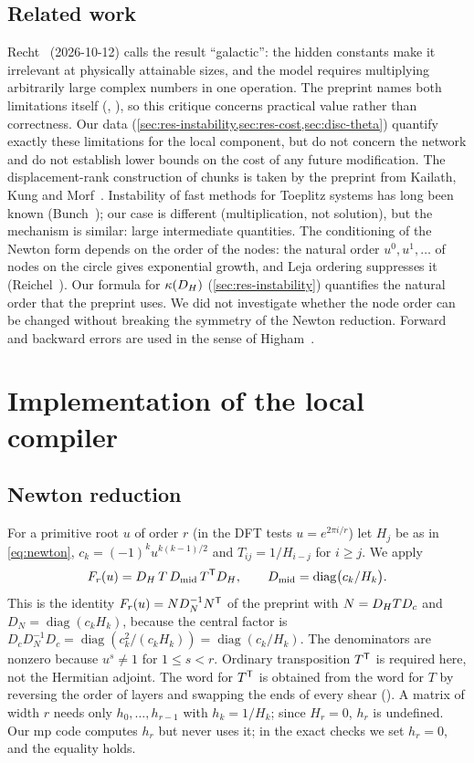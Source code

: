 \documentclass[11pt]{article}
\theoremstyle{plain}
\DeclareMathOperator{\diag}{diag}
\begin{document}
\subsection{Related work}\label{sec:related}
Recht~\citep{recht2026} (2026-10-12) calls the result ``galactic'': the hidden constants make it irrelevant at physically attainable sizes, and the model requires multiplying arbitrarily large complex numbers in one operation. The preprint names both limitations itself (, ), so this critique concerns practical value rather than correctness. Our data (\cref{sec:res-instability,sec:res-cost,sec:disc-theta}) quantify exactly these limitations for the local component, but do not concern the network and do not establish lower bounds on the cost of any future modification. The displacement-rank construction of chunks is taken by the preprint from Kailath, Kung and Morf~\citep{kailath1979}. Instability of fast methods for Toeplitz systems has long been known (Bunch~\citep{bunch1985}); our case is different (multiplication, not solution), but the mechanism is similar: large intermediate quantities. The conditioning of the Newton form depends on the order of the nodes: the natural order $u^0,u^1,\dots$ of nodes on the circle gives exponential growth, and Leja ordering suppresses it (Reichel~\citep{reichel1990}). Our formula for $\kappa(D_H)$ (\cref{sec:res-instability}) quantifies the natural order that the preprint uses. We did not investigate whether the node order can be changed without breaking the symmetry of the Newton reduction. Forward and backward errors are used in the sense of Higham~\citep{higham2002}.

\section{Implementation of the local compiler}\label{sec:impl}

\subsection{Newton reduction}\label{sec:newton}
For a primitive root $u$ of order $r$ (in the DFT tests $u=e^{2\pi i/r}$) let $H_j$ be as in \eqref{eq:newton}, $c_k=(-1)^ku^{k(k-1)/2}$ and $T_{ij}=1/H_{i-j}$ for $i\ge j$. We apply
\begin{equation}\label{eq:chain}
F_r(u)=\Dh\,T\,\Dmid\,T^{\T}\Dh,\qquad \Dmid=\diag\bigl(c_k/H_k\bigr).
\end{equation}
This is the identity $F_r(u)=ND_N^{-1}N^{\mathsf{T}}$ of the preprint with $N=D_H TD_c$ and $D_N=\diag(c_kH_k)$, because the central factor is $D_cD_N^{-1}D_c=\diag(c_k^2/(c_kH_k))=\diag(c_k/H_k)$. The denominators are nonzero because $u^s\ne1$ for $1\le s<r$. Ordinary transposition $T^{\mathsf{T}}$ is required here, not the Hermitian adjoint. The word for $T^{\mathsf{T}}$ is obtained from the word for $T$ by reversing the order of layers and swapping the ends of every shear (). A matrix of width $r$ needs only $h_0,\dots,h_{r-1}$ with $h_k=1/H_k$; since $H_r=0$, $h_r$ is undefined. Our mp code computes $h_r$ but never uses it; in the exact checks we set $h_r=0$, and the equality holds.
\end{document}

